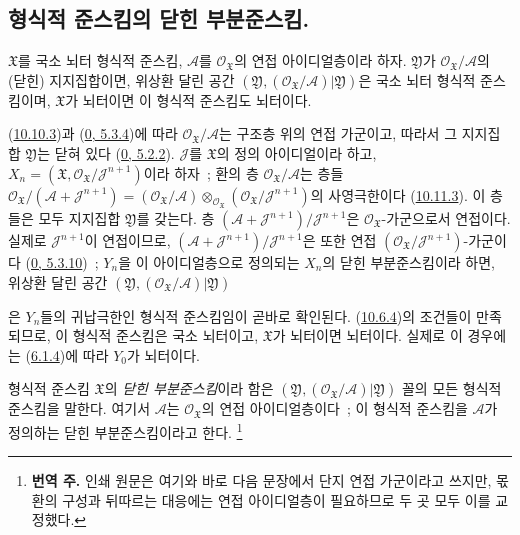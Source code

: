 \subsection{형식적 준스킴의 닫힌 부분준스킴.}
\label{subsection:I.10.14-ko}

\begin{proposition}[10.14.1]
\label{I.10.14.1-ko}
$\mathfrak{X}$를 국소 뇌터 형식적 준스킴,
$\mathscr{A}$를 $\mathscr{O}_{\mathfrak{X}}$의 연접 아이디얼층이라
하자. $\mathfrak{Y}$가 $\mathscr{O}_{\mathfrak{X}}/\mathscr{A}$의
(닫힌) 지지집합이면, 위상환 달린 공간
$(\mathfrak{Y},(\mathscr{O}_{\mathfrak{X}}/\mathscr{A})|\mathfrak{Y})$은
국소 뇌터 형식적 준스킴이며, $\mathfrak{X}$가 뇌터이면 이 형식적
준스킴도 뇌터이다.
\end{proposition}

(\hyperref[I.10.10.3-ko]{10.10.3})과
(\hyperref[0.5.3.4-ko]{0, 5.3.4})에 따라
$\mathscr{O}_{\mathfrak{X}}/\mathscr{A}$는 구조층 위의 연접 가군이고, 따라서 그
지지집합 $\mathfrak{Y}$는 닫혀 있다
(\hyperref[0.5.2.2-ko]{0, 5.2.2}). $\mathscr{J}$를
$\mathfrak{X}$의 정의 아이디얼이라 하고,
$X_n=(\mathfrak{X},\mathscr{O}_{\mathfrak{X}}/\mathscr{J}^{n+1})$이라
하자~; 환의 층 $\mathscr{O}_{\mathfrak{X}}/\mathscr{A}$는 층들
$\mathscr{O}_{\mathfrak{X}}/(\mathscr{A}+\mathscr{J}^{n+1})
=(\mathscr{O}_{\mathfrak{X}}/\mathscr{A})
\otimes_{\mathscr{O}_{\mathfrak{X}}}
(\mathscr{O}_{\mathfrak{X}}/\mathscr{J}^{n+1})$의 사영극한이다
(\hyperref[I.10.11.3-ko]{10.11.3}). 이 층들은 모두 지지집합
$\mathfrak{Y}$를 갖는다. 층
$(\mathscr{A}+\mathscr{J}^{n+1})/\mathscr{J}^{n+1}$은
$\mathscr{O}_{\mathfrak{X}}$-가군으로서 연접이다. 실제로
$\mathscr{J}^{n+1}$이 연접이므로,
$(\mathscr{A}+\mathscr{J}^{n+1})/\mathscr{J}^{n+1}$은 또한 연접
$(\mathscr{O}_{\mathfrak{X}}/\mathscr{J}^{n+1})$-가군이다
(\hyperref[0.5.3.10-ko]{0, 5.3.10})~; $Y_n$을 이 아이디얼층으로
정의되는 $X_n$의 닫힌 부분준스킴이라 하면, 위상환 달린 공간
$(\mathfrak{Y},(\mathscr{O}_{\mathfrak{X}}/\mathscr{A})|\mathfrak{Y})$

은 $Y_n$들의 귀납극한인 형식적 준스킴임이 곧바로 확인된다.
(\hyperref[I.10.6.4-ko]{10.6.4})의 조건들이 만족되므로, 이 형식적
준스킴은 국소 뇌터이고, $\mathfrak{X}$가 뇌터이면 뇌터이다. 실제로
이 경우에는 (\hyperref[I.6.1.4-ko]{6.1.4})에 따라 $Y_0$가 뇌터이다.

\begin{definition}[10.14.2]
\label{I.10.14.2-ko}
형식적 준스킴 $\mathfrak{X}$의 \emph{닫힌 부분준스킴}이라 함은
$(\mathfrak{Y},(\mathscr{O}_{\mathfrak{X}}/\mathscr{A})|\mathfrak{Y})$
꼴의 모든 형식적 준스킴을 말한다. 여기서 $\mathscr{A}$는
$\mathscr{O}_{\mathfrak{X}}$의 연접 아이디얼층이다~; 이 형식적
준스킴을 $\mathscr{A}$가 정의하는 닫힌 부분준스킴이라고 한다.
\footnote{\textbf{번역 주.} 인쇄 원문은 여기와 바로 다음 문장에서
단지 연접 가군이라고 쓰지만, 몫환의 구성과 뒤따르는 대응에는 연접
아이디얼층이 필요하므로 두 곳 모두 이를 교정했다.}
\end{definition}

